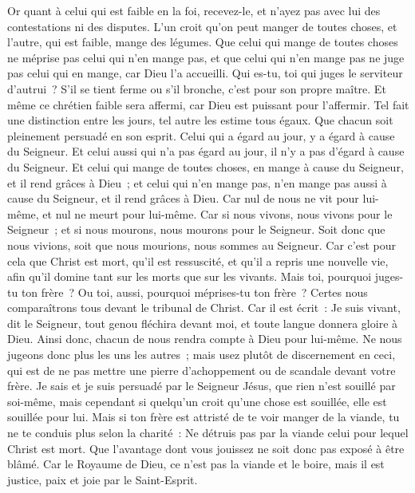 \begin{multicols}{2}
\VerseOne{}Or quant à celui qui est faible en la foi, recevez-le, et n'ayez pas avec lui des contestations ni des disputes.
L'un croit qu'on peut manger de toutes choses, et l'autre, qui est faible, mange des légumes.
Que celui qui mange de toutes choses ne méprise pas celui qui n'en mange pas, et que celui qui n'en mange pas ne juge pas celui qui en mange, car Dieu l'a accueilli.
Qui es-tu, toi qui juges le serviteur d'autrui~? S'il se tient ferme ou s'il bronche, c'est pour son propre maître. Et même ce chrétien faible sera affermi, car Dieu est puissant pour l'affermir.
Tel fait une distinction entre les jours, tel autre les estime tous égaux. Que chacun soit pleinement persuadé en son esprit.
Celui qui a égard au jour, y a égard à cause du Seigneur. Et celui aussi qui n'a pas égard au jour, il n'y a pas d'égard à cause du Seigneur. Et celui qui mange de toutes choses, en mange à cause du Seigneur, et il rend grâces à Dieu~; et celui qui n'en mange pas, n'en mange pas aussi à cause du Seigneur, et il rend grâces à Dieu.
Car nul de nous ne vit pour lui-même, et nul ne meurt pour lui-même.
Car si nous vivons, nous vivons pour le Seigneur~; et si nous mourons, nous mourons pour le Seigneur. Soit donc que nous vivions, soit que nous mourions, nous sommes au Seigneur.
Car c'est pour cela que Christ est mort, qu'il est ressuscité, et qu'il a repris une nouvelle vie, afin qu'il domine tant sur les morts que sur les vivants.
Mais toi, pourquoi juges-tu ton frère~? Ou toi, aussi, pourquoi méprises-tu ton frère~? Certes nous comparaîtrons tous devant le tribunal de Christ.
Car il est écrit~: Je suis vivant, dit le Seigneur, tout genou fléchira devant moi, et toute langue donnera gloire à Dieu.
 Ainsi donc, chacun de nous rendra compte à Dieu pour lui-même.
Ne nous jugeons donc plus les uns les autres~; mais usez plutôt de discernement en ceci, qui est de ne pas mettre une pierre d'achoppement ou de scandale devant votre frère.
Je sais et je suis persuadé par le Seigneur Jésus, que rien n'est souillé par soi-même, mais cependant si quelqu'un croit qu'une chose est souillée, elle est souillée pour lui.
Mais si ton frère est attristé de te voir manger de la viande, tu ne te conduis plus selon la charité~: Ne détruis pas par la viande celui pour lequel Christ est mort.
Que l'avantage dont vous jouissez ne soit donc pas exposé à être blâmé.
Car le Royaume de Dieu, ce n'est pas la viande et le boire, mais il est justice, paix et joie par le Saint-Esprit.

\end{multicols}
